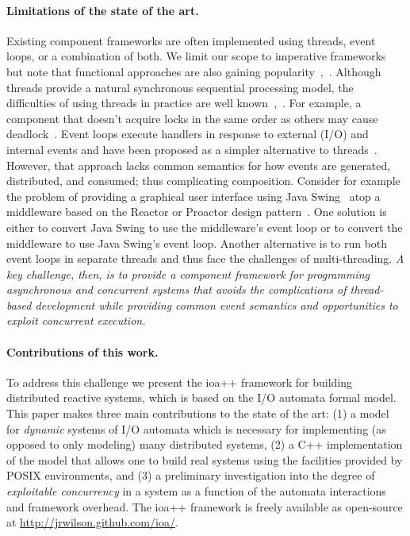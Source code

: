 \paragraph*{Limitations of the state of the art.}
Existing component frameworks are often implemented using threads, event loops, or a combination of both.
We limit our scope to imperative frameworks but note that functional approaches are also gaining popularity~\cite{armstrong1996concurrent},~\cite{halloway2009programming}.
Although threads provide a natural synchronous sequential processing model, the difficulties of using threads in practice are well known~\cite{lee2006problem},~\cite{sutter2005free}.
For example, a component that doesn't acquire locks in the same order as others may cause deadlock~\cite{havender1968avoiding}.
Event loops execute handlers in response to external (I/O) and internal events and have been proposed as a simpler alternative to threads~\cite{ousterhout1996threads}.
However, that approach lacks common semantics for how events are generated, distributed, and consumed; thus complicating composition.
Consider for example the problem of providing a graphical user interface using Java Swing~\cite{eckstein1998java} atop a middleware based on the Reactor or Proactor design pattern~\cite{schmidt2000pattern}.
One solution is either to convert Java Swing to use the middleware's event loop or to convert the middleware to use Java Swing's event loop.
Another alternative is to run both event loops in separate threads and thus face the challenges of multi-threading.
\emph{A key challenge, then, is to provide a component framework for programming asynchronous and concurrent systems that avoids the complications of thread-based development while providing common event semantics and opportunities to exploit concurrent execution.}

\paragraph*{Contributions of this work.}
To address this challenge we present the ioa++ framework for building distributed reactive systems, which is based on the I/O automata formal model. 
This paper makes three main contributions to the state of the art:
(1)  a model for \emph{dynamic} systems of I/O automata which is necessary for implementing (as opposed to only modeling) many distributed systems,
(2)  a C++ implementation of the model that allows one to build real systems using the facilities provided by POSIX environments, and
(3)  a preliminary investigation into the degree of \emph{exploitable concurrency} in a system as a function of the automata interactions and framework overhead.
The ioa++ framework is freely available as open-source at \url{http://jrwilson.github.com/ioa/}.

